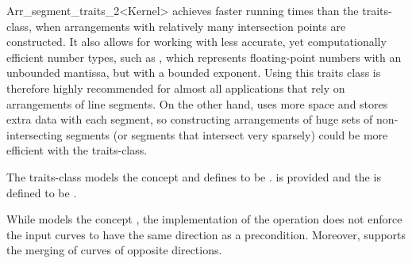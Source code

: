 \begin{ccRefClass}{Arr_segment_traits_2<Kernel>}
\ccRefName{} achieves faster running times than the
 traits-class, when
arrangements with relatively many intersection points are constructed.
It also allows for working with less accurate, yet computationally
efficient number types, such as , which
represents floating-point numbers with an unbounded mantissa, but with
a bounded exponent. Using this traits class is therefore highly recommended
for almost all applications that rely on arrangements of line segments.
On the other hand, \ccRefName{} uses more space and stores extra data with
each segment, so constructing arrangements of huge sets of non-intersecting
segments (or segments that intersect very sparsely) could be more efficient
with the  traits-class.

The traits-class models the  concept
and defines  to
be .
 is provided and the 
is defined to be .

While \ccRefName{} models the concept
, the implementation of
the  operation does not enforce the input curves
to have the same direction as a precondition. Moreover, \ccRefName{}
supports the merging of curves of opposite directions.

 
\ccIsModel
    \\
    \\

\end{ccRefClass}

\ccRefPageEnd
